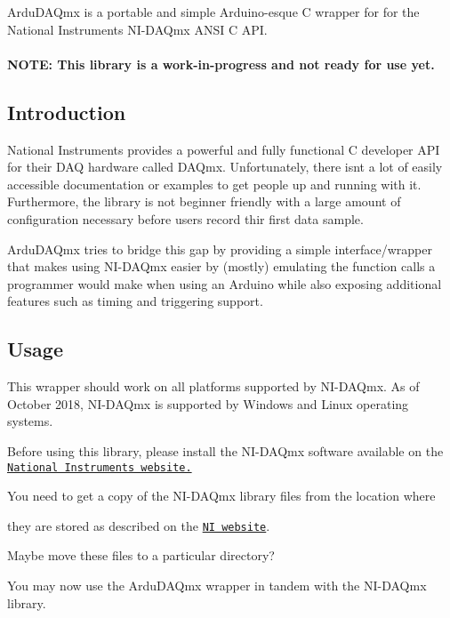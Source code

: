 {\ttfamily Ardu\+D\+A\+Qmx} is a portable and simple Arduino-\/esque C wrapper for for the National Instruments N\+I-\/\+D\+A\+Qmx A\+N\+SI C A\+PI.

\paragraph*{N\+O\+TE\+: This library is a work-\/in-\/progress and not ready for use yet.}

\subsection*{Introduction}

National Instruments provides a powerful and fully functional C developer A\+PI for their D\+AQ hardware called D\+A\+Qmx. Unfortunately, there isn\textquotesingle{}t a lot of easily accessible documentation or examples to get people up and running with it. Furthermore, the library is not beginner friendly with a large amount of configuration necessary before users record thir first data sample.

Ardu\+D\+A\+Qmx tries to bridge this gap by providing a simple interface/wrapper that makes using N\+I-\/\+D\+A\+Qmx easier by (mostly) emulating the function calls a programmer would make when using an Arduino while also exposing additional features such as timing and triggering support.

\subsection*{Usage}


\begin{DoxyItemize}
\item This wrapper should work on all platforms supported by N\+I-\/\+D\+A\+Qmx. As of October 2018, N\+I-\/\+D\+A\+Qmx is supported by Windows and Linux operating systems.
\item Before using this library, please install the N\+I-\/\+D\+A\+Qmx software available on the \href{https://www.ni.com/dataacquisition/nidaqmx.htm/}{\tt National Instruments website.}
\item You need to get a copy of the N\+I-\/\+D\+A\+Qmx library files from the location where
\item they are stored as described on the \href{http://www.ni.com/product-documentation/54392/en/}{\tt NI website}.
\item Maybe move these files to a particular directory?
\item You may now use the Ardu\+D\+A\+Qmx wrapper in tandem with the N\+I-\/\+D\+A\+Qmx library.
\end{DoxyItemize}

